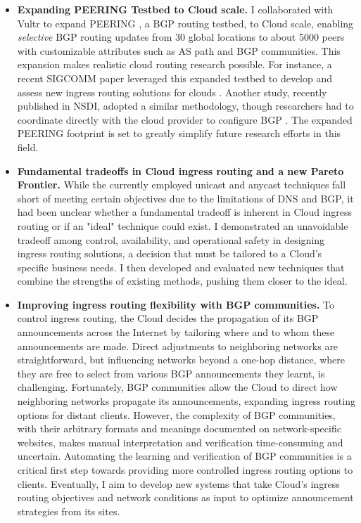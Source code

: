 \documentclass[sigconf,nonacm,screen,letterpaper,10pt]{acmart}
\begin{document}
\begin{itemize}[leftmargin=*]
\item


 \textbf{Expanding PEERING Testbed to Cloud scale.} I collaborated with Vultr to expand PEERING \cite{schlinker19peering}, a BGP routing testbed, to Cloud scale, enabling \textit{selective} BGP routing updates from 30 global locations to about 5000 peers with customizable attributes such as AS path and BGP communities. This expansion makes realistic cloud routing research possible. For instance, a recent SIGCOMM paper leveraged this expanded testbed to develop and assess new ingress routing solutions for clouds \cite{painter}. Another study, recently published in NSDI, adopted a similar methodology, though researchers had to coordinate directly with the cloud provider to configure BGP \cite{tango-nsdi}. The expanded PEERING footprint is set to greatly simplify future research efforts in this field.


\item 
\textbf{Fundamental tradeoffs in Cloud ingress routing and a new Pareto Frontier.} While the currently employed unicast and anycast techniques fall short of meeting certain objectives due to the limitations of DNS and BGP, it had been unclear whether a fundamental tradeoff is inherent in Cloud ingress routing or if an "ideal" technique could exist. I demonstrated an unavoidable tradeoff among control, availability, and operational safety in designing ingress routing solutions, a decision that must be tailored to a Cloud's specific business needs. I then developed and evaluated new techniques that combine the strengths of existing methods, pushing them closer to the ideal.


\item 
\textbf{Improving ingress routing flexibility with BGP communities.} To control ingress routing, the Cloud decides the propagation of its BGP announcements across the Internet by tailoring where and to whom these announcements are made. Direct adjustments to neighboring networks are straightforward, but influencing networks beyond a one-hop distance, where they are free to select from various BGP announcements they learnt, is challenging. Fortunately, BGP communities allow the Cloud to direct how neighboring networks propagate its announcements, expanding ingress routing options for distant clients.  However, the complexity of BGP communities, with their arbitrary formats and meanings documented on network-specific websites, makes manual interpretation and verification time-consuming and uncertain. Automating the learning and verification of BGP communities is a critical first step towards providing more controlled ingress routing options to clients. Eventually, I aim to develop new systems that take Cloud's ingress routing objectives and network conditions as input to optimize announcement strategies from its sites.


\end{itemize}
\end{document}
